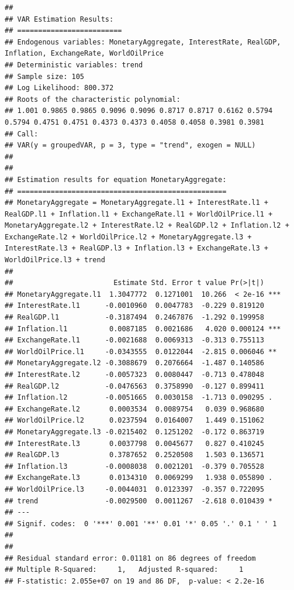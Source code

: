 \documentclass[11pt,preprint, authoryear]{elsarticle}
\numberwithin{equation}{section}
\numberwithin{figure}{section}
\numberwithin{table}{section}
\begin{document}
\begin{verbatim}
## 
## VAR Estimation Results:
## ========================= 
## Endogenous variables: MonetaryAggregate, InterestRate, RealGDP, Inflation, ExchangeRate, WorldOilPrice 
## Deterministic variables: trend 
## Sample size: 105 
## Log Likelihood: 800.372 
## Roots of the characteristic polynomial:
## 1.001 0.9865 0.9865 0.9096 0.9096 0.8717 0.8717 0.6162 0.5794 0.5794 0.4751 0.4751 0.4373 0.4373 0.4058 0.4058 0.3981 0.3981
## Call:
## VAR(y = groupedVAR, p = 3, type = "trend", exogen = NULL)
## 
## 
## Estimation results for equation MonetaryAggregate: 
## ================================================== 
## MonetaryAggregate = MonetaryAggregate.l1 + InterestRate.l1 + RealGDP.l1 + Inflation.l1 + ExchangeRate.l1 + WorldOilPrice.l1 + MonetaryAggregate.l2 + InterestRate.l2 + RealGDP.l2 + Inflation.l2 + ExchangeRate.l2 + WorldOilPrice.l2 + MonetaryAggregate.l3 + InterestRate.l3 + RealGDP.l3 + Inflation.l3 + ExchangeRate.l3 + WorldOilPrice.l3 + trend 
## 
##                        Estimate Std. Error t value Pr(>|t|)    
## MonetaryAggregate.l1  1.3047772  0.1271001  10.266  < 2e-16 ***
## InterestRate.l1      -0.0010960  0.0047783  -0.229 0.819120    
## RealGDP.l1           -0.3187494  0.2467876  -1.292 0.199958    
## Inflation.l1          0.0087185  0.0021686   4.020 0.000124 ***
## ExchangeRate.l1      -0.0021688  0.0069313  -0.313 0.755113    
## WorldOilPrice.l1     -0.0343555  0.0122044  -2.815 0.006046 ** 
## MonetaryAggregate.l2 -0.3088679  0.2076664  -1.487 0.140586    
## InterestRate.l2      -0.0057323  0.0080447  -0.713 0.478048    
## RealGDP.l2           -0.0476563  0.3758990  -0.127 0.899411    
## Inflation.l2         -0.0051665  0.0030158  -1.713 0.090295 .  
## ExchangeRate.l2       0.0003534  0.0089754   0.039 0.968680    
## WorldOilPrice.l2      0.0237594  0.0164007   1.449 0.151062    
## MonetaryAggregate.l3 -0.0215402  0.1251202  -0.172 0.863719    
## InterestRate.l3       0.0037798  0.0045677   0.827 0.410245    
## RealGDP.l3            0.3787652  0.2520508   1.503 0.136571    
## Inflation.l3         -0.0008038  0.0021201  -0.379 0.705528    
## ExchangeRate.l3       0.0134310  0.0069299   1.938 0.055890 .  
## WorldOilPrice.l3     -0.0044031  0.0123397  -0.357 0.722095    
## trend                -0.0029500  0.0011267  -2.618 0.010439 *  
## ---
## Signif. codes:  0 '***' 0.001 '**' 0.01 '*' 0.05 '.' 0.1 ' ' 1
## 
## 
## Residual standard error: 0.01181 on 86 degrees of freedom
## Multiple R-Squared:     1,   Adjusted R-squared:     1 
## F-statistic: 2.055e+07 on 19 and 86 DF,  p-value: < 2.2e-16 

\end{verbatim}
\end{document}

